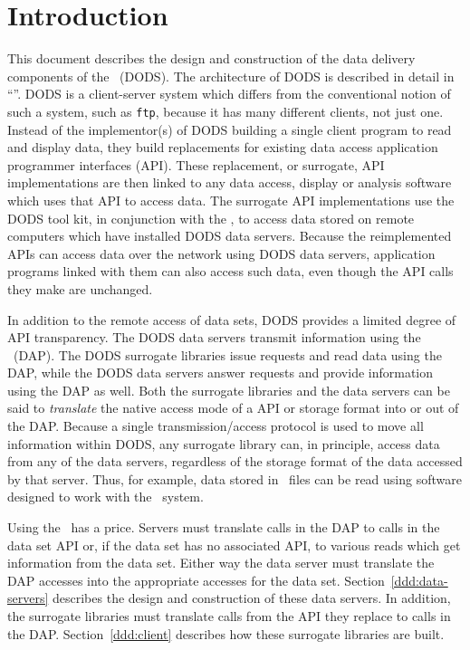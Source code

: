 \tableofcontents

\newpage

\section{Introduction}

This document describes the design and construction of the data delivery
components of the \DODS\ (DODS). The architecture of DODS is described in
detail in ``\DDA''.  DODS is a client-server system which differs from the
conventional notion of such a system, such as {\tt ftp}, because it has many
different clients, not just one.  Instead of the implementor(s) of DODS
building a single client program to read and display data, they build
replacements for existing data access application programmer interfaces
(API). These replacement, or surrogate, API implementations are then linked
to any data access, display or analysis software which uses that API to
access data. The surrogate API implementations use the DODS tool kit, in
conjunction with the \HTTPD, to access data stored on remote computers which
have installed DODS data servers.  Because the reimplemented APIs can access
data over the network using DODS data servers, application programs linked
with them can also access such data, even though the API calls they make are
unchanged.

In addition to the remote access of data sets, DODS provides a limited degree
of API transparency. The DODS data servers transmit information using the
\Dap\ (DAP).  The DODS surrogate libraries issue requests and read data using
the DAP, while the DODS data servers answer requests and provide information
using the DAP as well. Both the surrogate libraries and the data servers can
be said to {\em translate\/} the native access mode of a API or storage
format into or out of the DAP\@. Because a single transmission/access protocol
is used to move all information within DODS, any surrogate library can, in
principle, access data from any of the data servers, regardless of the
storage format of the data accessed by that server. Thus, for example, data
stored in \netcdf\ files can be read using software designed to work with the
\jgofs\ system.

Using the \dap\ has a price. Servers must translate calls in the DAP to calls
in the data set API or, if the data set has no associated API, to various
reads which get information from the data set. Either way the data server
must translate the DAP accesses into the appropriate accesses for the data
set. Section~\ref{ddd:data-servers} describes the design and construction of
these data servers. In addition, the surrogate libraries must translate calls
from the API they replace to calls in the DAP\@. Section~\ref{ddd:client}
describes how these surrogate libraries are built.

